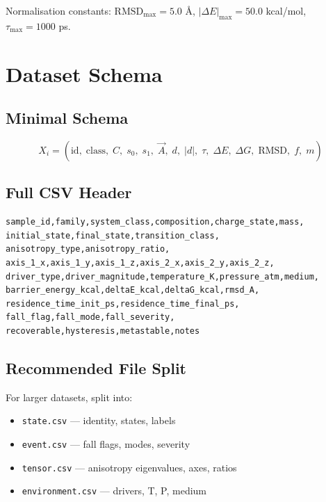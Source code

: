 \documentclass[11pt]{article}
\begin{document}
Normalisation constants: $\text{RMSD}_{\max} = 5.0$ \AA, $|\Delta E|_{\max} = 50.0$ kcal/mol, $\tau_{\max} = 1000$ ps.

\section{Dataset Schema}

\subsection{Minimal Schema}

\begin{equation}
X_i = (\text{id}, \; \text{class}, \; C, \; s_0, \; s_1, \; \vec{A}, \; d, \; |d|, \; \tau, \; \Delta E, \; \Delta G, \; \text{RMSD}, \; f, \; m)
\end{equation}

\subsection{Full CSV Header}

\begin{lstlisting}[basicstyle=\ttfamily\scriptsize]
sample_id,family,system_class,composition,charge_state,mass,
initial_state,final_state,transition_class,
anisotropy_type,anisotropy_ratio,
axis_1_x,axis_1_y,axis_1_z,axis_2_x,axis_2_y,axis_2_z,
driver_type,driver_magnitude,temperature_K,pressure_atm,medium,
barrier_energy_kcal,deltaE_kcal,deltaG_kcal,rmsd_A,
residence_time_init_ps,residence_time_final_ps,
fall_flag,fall_mode,fall_severity,
recoverable,hysteresis,metastable,notes
\end{lstlisting}

\subsection{Recommended File Split}

For larger datasets, split into:
\begin{itemize}
  \item \texttt{state.csv} --- identity, states, labels
  \item \texttt{event.csv} --- fall flags, modes, severity
  \item \texttt{tensor.csv} --- anisotropy eigenvalues, axes, ratios
  \item \texttt{environment.csv} --- drivers, T, P, medium
\end{itemize}
\end{document}
